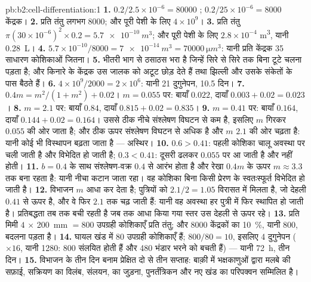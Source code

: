 \begin{solution}{pb:b2:cell-differentiation:1}
\textbf{1.} $0.2/2.5\times 10^{-6} = \num{80000}$ ;
$0.2/25\times 10^{-6} = \num{8000}$ केंद्रक।
\textbf{2.} प्रति तंतु लगभग \num{8000}; और पूरी पेशी के लिए $4\times 10^{9}$।
\textbf{3.} प्रति तंतु $\pi(30\times 10^{-6})^{2}\times 0.2 = \qty{5.7e-10}{m^3}$;
और पूरी पेशी के लिए $2.8\times 10^{-4}$ \unit{m^3}, यानी \qty{0.28}{L}।
\textbf{4.} $5.7\times 10^{-10}/8000 = \qty{7e-14}{m^3} =
\qty{70000}{\micro m^3}$: यानी प्रति केंद्रक 35 साधारण कोशिकाओं जितना।
\textbf{5.} भीतरी भाग  से ठसाठस भरा है जिन्हें सिरे से सिरे
तक बिना टूटे चलना पड़ता है; और किनारे के केंद्रक उस जालक को
अटूट छोड़ देते हैं तथा झिल्ली और उसके संकेतों के पास बैठते हैं।
\textbf{6.} $4\times 10^{9}/2000 = 2\times 10^{6}$: यानी 21 दुगुनेपन, 10.5
दिन।
\textbf{7.} $0.4m = m^{2}/(1 + m^{2}) + 0.02$। $m = 0.055$ पर: बायाँ
$0.022$, दायाँ $0.003 + 0.02 = 0.023$।
\textbf{8.} $m = 2.1$ पर: बायाँ $0.84$, दायाँ $0.815 + 0.02 = 0.835$।
\textbf{9.} $m = 0.41$ पर: बायाँ $0.164$, दायाँ $0.144 + 0.02 = 0.164$।
उससे ठीक नीचे संश्लेषण विघटन से कम है, इसलिए $m$ गिरकर
$0.055$ की ओर जाता है; और ठीक ऊपर संश्लेषण विघटन से अधिक है और $m$
$2.1$ की ओर चढ़ता है: यानी कोई भी विस्थापन बढ़ता जाता है --- अस्थिर।
\textbf{10.} $0.6 > 0.41$: पहली कोशिका चालू अवस्था पर चली जाती है और
विभेदित हो जाती है; $0.3 < 0.41$: दूसरी ढलकर $0.055$ पर आ जाती है और
नहीं होती।
\textbf{11.} $b = 0.4$ के साथ संश्लेषण-वक्र $0.4$ से आरंभ होता है और
रेखा $0.4m$ के ऊपर $m \approx 3.3$ तक बना रहता है: यानी नीचा कटान
जाता रहा। वह कोशिका बिना किसी प्रेरण के स्वतःस्फूर्त विभेदित हो जाती है।
\textbf{12.} विभाजन $m$ आधा कर देता है; पुत्रियों को $2.1/2 =
1.05$ विरासत में मिलता है, जो देहली $0.41$ से ऊपर है, और वे फिर $2.1$ तक
चढ़ जाती हैं: यानी वह अवस्था हर पुत्री में फिर स्थापित हो जाती है।
प्रतिबद्धता तब तक बची रहती है जब तक आधा किया गया स्तर उस देहली से ऊपर रहे।
\textbf{13.} प्रति मिमी $4$ $\times$ \qty{200}{mm} $= 800$ उपग्रही
कोशिकाएँ प्रति तंतु; और \num{8000} केंद्रकों का \qty{10}{\%}, यानी
\num{800}, बदलना पड़ता है।
\textbf{14.} घायल खंड में $80$ उपग्रही कोशिकाएँ हैं; $800/80 =
10$, इसलिए 4 दुगुनेपन ($\times 16$, यानी \num{1280}: 800 संलयित होती हैं और 480
भंडार भरने को बचती हैं) --- यानी \qty{72}{h}, तीन दिन।
\textbf{15.} विभाजन के तीन दिन बनाम प्रेक्षित दो से तीन सप्ताह:
बाक़ी में भक्षकाणुओं द्वारा मलबे की सफ़ाई, सक्रियण का विलंब, संलयन,
 का जुड़ना, पुनर्तंत्रिकन और नए खंड का
परिपक्वन सम्मिलित है।

\end{solution}
